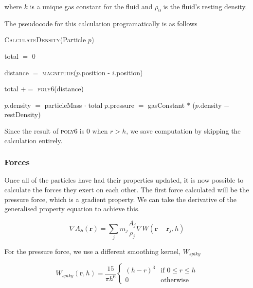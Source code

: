 \documentclass[a4paper, 12pt]{article}
\begin{document}
    where $k$ is a unique gas constant for the fluid and $\rho_0$ is the fluid's resting density.

    The pseudocode for this calculation programatically is as follows

    \begin{algorithm}[H]
        \caption{\textsc{CalculateDensity}(Particle $p$)}
    
        \begin{algorithmic}[1]
            \State total $=$ 0
            
                \State distance $=$ \textsc{magnitude}($p$.position - $i$.position)

                    \State total $+=$ \textsc{poly6}(distance)
                \EndIf
            \EndFor

            \State $p$.density $=$ particleMass $\cdot$ total
            \State $p$.pressure $=$ gasConstant $*$ ($p$.density $-$ restDensity)
        \end{algorithmic}

    \end{algorithm}

    Since the result of \textsc{poly6} is 0 when $r > h$, we save computation by skipping the calculation entirely.

    \subsubsection{Forces}

    Once all of the particles have had their properties updated, it is now possible to calculate the forces they exert on each other. The first force calculated will be the pressure force, which is a gradient property. We can take the derivative of the generalised property equation to achieve this.

    \begin{equation}
        \nabla A_S(\textbf{r}) = \sum_{j}{m_j \frac{A_j}{\rho_j}\nabla{W(\textbf{r} - \textbf{r}_j, h)}}
    \end{equation}

    For the pressure force, we use a different smoothing kernel, $W_{spiky}$

    \begin{equation}
        W_{spiky}(\textbf{r}, h) = \frac{15}{\pi{h}^6}
        \begin{cases}
            (h-r)^3 & \text{if } 0 \leq r \leq h \\
            0 & \text{otherwise}
        \end{cases} 
    \end{equation}
\end{document}
